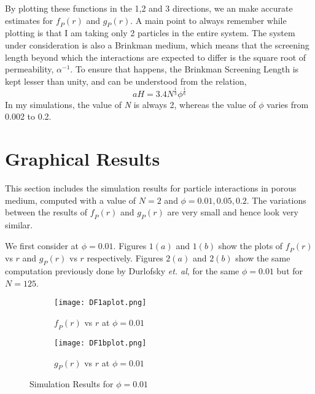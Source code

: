 \documentclass[12pt]{article}
\begin{document}
By plotting these functions in the 1,2 and 3 directions, we an make accurate estimates for $\textit{f}_P(r)$ and $\textit{g}_{P}(r)$. A main point to always remember while plotting is that I am taking only 2 particles in the entire system. The system under consideration is also a Brinkman medium, which means that the screening length beyond which the interactions are expected to differ is the square root of permeability, $\alpha^{-1}$. To ensure that happens, the Brinkman Screening Length is kept lesser than unity, and can be understood from the relation, 
\begin{equation}
aH=3.4N^{\frac{1}{3}}\phi^{\frac{1}{6}}
\end{equation}
In my simulations, the value of \textit{N} is always 2, whereas the value of $\phi$ varies from 0.002 to 0.2.

\section{Graphical Results}
\label{graphs}

This section includes the simulation results for particle interactions in porous medium, computed with a value of $N=2$ and $\phi=0.01, 0.05, 0.2$. The variations between the results of $\textit{f}_P(r)$ and $\textit{g}_{P}(r)$ are very small and hence look very similar. 


We first consider at $\phi=0.01$. Figures $1(a)$ and $1(b)$ show the plots of $\textit{f}_P(r)$ vs $r$ and $\textit{g}_{P}(r)$ vs $r$ respectively. Figures $2(a)$ and $2(b)$ show the same computation previously done by Durlofsky \textit{et. al}, for the same $\phi=0.01$ but for $N=125$.



\begin{figure}[ht]
\begin{subfigure}{.5\textwidth}
  \centering
  \texttt{[image: DF1aplot.png]}  
  \caption{$\textit{f}_P(r)$ vs $r$ at $\phi=0.01$}
\end{subfigure}
\begin{subfigure}{.5\textwidth}
  \centering
  \texttt{[image: DF1bplot.png]}  
  \caption{$\textit{g}_P(r)$ vs $r$ at $\phi=0.01$}
  \label{fig:sub-second}
\end{subfigure}
\caption{Simulation Results for $\phi=0.01$}
\label{fig:fig}
\end{figure}
\end{document}
